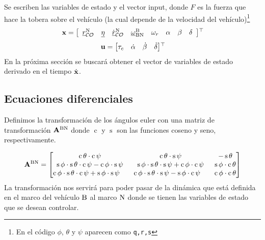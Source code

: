 Se escriben las variables de estado y el vector input, donde $F$ es la fuerza que hace la tobera sobre el vehículo (la cual depende de la velocidad del vehículo)\footnote{En el código $\phi$, $\theta$ y $\psi$ aparecen como \texttt{q,r,s}}
\begin{equation} \label{eq:ssVariables3D}
	\mathbf{x} = \left[
	\begin{array}{cccccccc}
		{ \underline{r} }_{\mathcal{CO}}^{\mathrm{N}} & { \underline{\eta} } &\dot{{ \underline{r} }}_{\mathcal{CO}}^{\mathrm{N}} &  { \underline{\omega} }_{\mathrm{BN}}^{\mathrm{B}} & \omega_r & \alpha & \beta & \delta
	\end{array}\right] \!^{\top}\!
\end{equation}
\begin{equation}\label{eq:ssInputs3D}
	\mathbf{u} = \begin{bmatrix}
		\tau_c & \dot{\alpha} & \dot{\beta} & \dot{\delta}
	\end{bmatrix} \!^{\top}\!
\end{equation}
En la próxima sección se buscará obtener el vector de variables de estado derivado en el tiempo $\dot{\mathbf{x}}$.

\subsection{Ecuaciones diferenciales} \label{subsec:modeloMatematico}

\def\scos{\operatorname{c}}
\def\ssin{\operatorname{s}}
Definimos la transformación de los ángulos euler con una matriz de transformación $\mathbf{A}^{\mathrm{BN}}$ donde $\scos$ y $\ssin$ son las funciones coseno y seno, respectivamente.

\begin{equation} \label{eq:matrizTransfoVehiculo}
	\transform{BN} = \begin{bmatrix}
	\scos \theta \cdot \scos \psi & \scos \theta \cdot \ssin \psi & - \ssin \theta \\
	\ssin \phi \cdot \ssin \theta \cdot \scos \psi - \scos \phi \cdot \ssin \psi & \ssin\phi \cdot \ssin\theta \cdot \ssin\psi + \scos\phi\cdot\scos\psi & \ssin\phi \cdot \scos\theta \\
	\scos\phi \cdot \ssin\theta \cdot \scos\psi + \ssin\phi \cdot \ssin\psi\quad & \scos\phi \cdot \ssin\theta \cdot \ssin\psi - \ssin\phi \cdot \scos\psi \quad& \scos\phi \cdot \scos\theta
	\end{bmatrix}
\end{equation}
La transformación nos servirá para poder pasar de la dinámica que está definida en el marco del vehículo $\mathrm{B}$ al marco $\mathrm{N}$ donde se tienen las variables de estado que se desean controlar.

